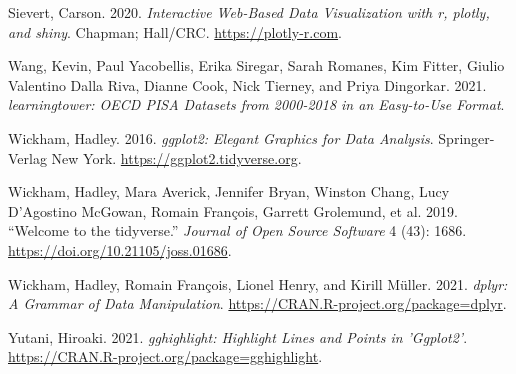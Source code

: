 \begin{CSLReferences}{1}{0}
\leavevmode{}%
Sievert, Carson. 2020. \emph{Interactive Web-Based Data Visualization with r, {plotly}, and {shiny}}. Chapman; Hall/CRC. \url{https://plotly-r.com}.

\leavevmode{}%
Wang, Kevin, Paul Yacobellis, Erika Siregar, Sarah Romanes, Kim Fitter, Giulio Valentino Dalla Riva, Dianne Cook, Nick Tierney, and Priya Dingorkar. 2021. \emph{{learningtower}: OECD PISA Datasets from 2000-2018 in an Easy-to-Use Format}.

\leavevmode{}%
Wickham, Hadley. 2016. \emph{{ggplot2}: Elegant Graphics for Data Analysis}. Springer-Verlag New York. \url{https://ggplot2.tidyverse.org}.

\leavevmode{}%
Wickham, Hadley, Mara Averick, Jennifer Bryan, Winston Chang, Lucy D'Agostino McGowan, Romain François, Garrett Grolemund, et al. 2019. {``Welcome to the {tidyverse}.''} \emph{Journal of Open Source Software} 4 (43): 1686. \url{https://doi.org/10.21105/joss.01686}.

\leavevmode{}%
Wickham, Hadley, Romain François, Lionel Henry, and Kirill Müller. 2021. \emph{{dplyr}: A Grammar of Data Manipulation}. \url{https://CRAN.R-project.org/package=dplyr}.

\leavevmode{}%
Yutani, Hiroaki. 2021. \emph{{gghighlight}: Highlight Lines and Points in 'Ggplot2'}. \url{https://CRAN.R-project.org/package=gghighlight}.

\end{CSLReferences}


\address{%
Priya Ravindra Dingorkar\\
Monash University\\%
Department of Econometrics and Business Statistics\\ Clayton, Australia\\
%
\url{https://www.linkedin.com/in/priya-dingorkar/}\\%
%
\href{mailto:priyadingorkar@gmail.com}{\nolinkurl{priyadingorkar@gmail.com}}%
}

\address{%
Kevin Y.X. Wang\\
University of Sydney\\%
School of Mathematics and Statistics\\ Sydney, Australia\\
%
\url{https://kevinwang09.github.io/}\\%
%
\href{mailto:kevinwangstats@gmail.com}{\nolinkurl{kevinwangstats@gmail.com}}%
}

\address{%
Dianne Cook\\
Monash University\\%
Department of Econometrics and Business Statistics\\ Clayton, Australia\\
%
\url{http://dicook.org/}\\%
%
\href{mailto:dicook@monash.edu}{\nolinkurl{dicook@monash.edu}}%
}
